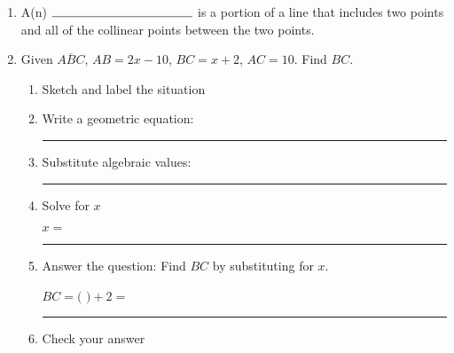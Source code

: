 \documentclass[12pt, oneside]{article}
\begin{document}
\begin{enumerate}
        \item A(n) $\rule{4cm}{0.15mm}$ is a portion of a line that includes two points and all of the collinear points between the two points.\smallskip

  \newpage

        \item Given $\overline{ABC}$, $AB=2x-10$, $BC=x+2$, $AC=10$. Find ${BC}$.
        \begin{enumerate}
          \item Sketch and label the situation
          \begin{flushright}
          \end{flushright} \vspace{2cm}
          \item Write a geometric equation: \rule{5cm}{0.15mm} \vspace{1cm}
          \item Substitute algebraic values: \rule{5cm}{0.15mm}
          \item Solve for $x$
          \vspace{4cm}
          \begin{center} $x=$ \rule{1cm}{0.15mm} \end{center}
          \item Answer the question: Find $BC$ by substituting for $x$.\\
          \begin{center} $BC=($ \hspace{1cm} $)+2=$ \rule{1cm}{0.15mm} \end{center} \bigskip
          \item Check your answer
        \end{enumerate}
        \vspace{2cm}


\end{enumerate}
\end{document}
